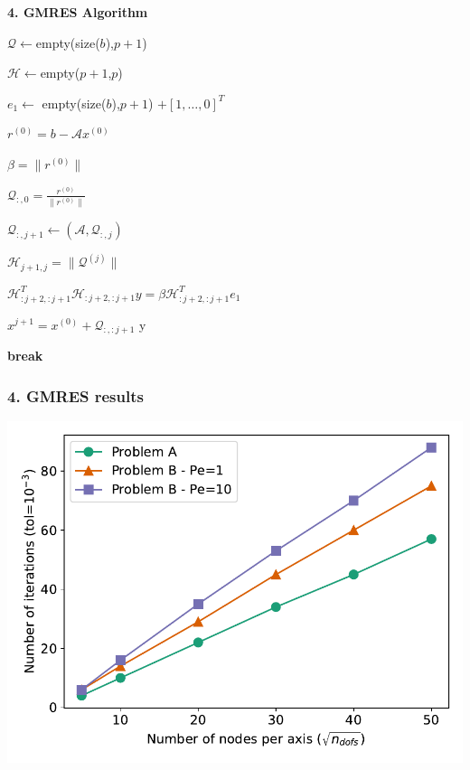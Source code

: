 \begin{frame}[fragile]{\textbf{4. GMRES Algorithm}}

\begin{algorithm}[H]

	$\mathcal{Q}\leftarrow$empty(size($b$),$p+1$)
	
	$\mathcal{H}\leftarrow$empty($p+1$,$p$)
	
	$e_1 \leftarrow$ empty(size($b$),$p+1$) $ + [1,\dots,0]^T$
	
	$r^{(0)} = b-\mathcal{A}x^{(0)}$
	
	$\beta = \lVert r^{(0)} \rVert$

	
	$\mathcal{Q}_{:,0} = \frac{r^{(0)}}{\lVert r^{(0)} \rVert}$
	
	

	{
	   $\mathcal{Q}_{:,j+1} \leftarrow (\mathcal{A},\mathcal{Q}_{:,j})$
	   
	   
	   $\mathcal{H}_{j+1,j} = \lVert \mathcal{Q}^{(j)} \rVert$
	   

	  
	  $\mathcal{H}_{:j+2,:j+1}^{T} \mathcal{H}_{:j+2,:j+1} y = \beta \mathcal{H}_{:j+2,:j+1}^{T}  e_1$
	
	  $x^{j+1} = x^{(0)} + \mathcal{Q}_{:,:j+1}$ y
	  
	  {
	  	\textbf{break}
	  }
	}
\end{algorithm}

\end{frame}

\begin{frame}
	\frametitle{\textbf{4. GMRES results}}
	\centering
	\includegraphics[width=0.95\linewidth]{images/gmres_its}
\end{frame}



